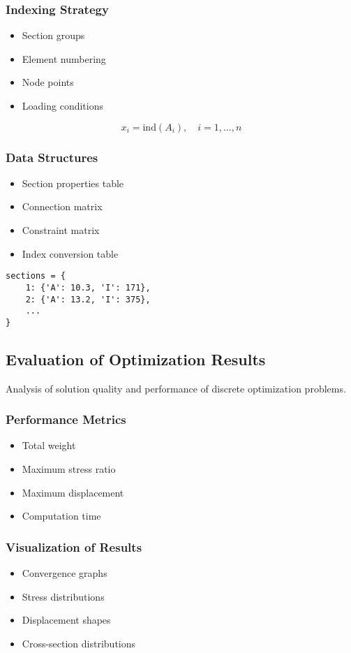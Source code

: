 \subsubsection{Indexing Strategy}
\begin{itemize}
    \item Section groups
    \item Element numbering
    \item Node points
    \item Loading conditions
\end{itemize}

\begin{equation}
x_i = \text{ind}(A_i), \quad i = 1,\ldots,n
\end{equation}


\subsubsection{Data Structures}
\begin{itemize}
    \item Section properties table
    \item Connection matrix
    \item Constraint matrix
    \item Index conversion table
\end{itemize}

\begin{tcolorbox}[title=Data Structure Example]
\begin{verbatim}
sections = {
    1: {'A': 10.3, 'I': 171},
    2: {'A': 13.2, 'I': 375},
    ...
}
\end{verbatim}
\end{tcolorbox}

\subsection{Evaluation of Optimization Results}
Analysis of solution quality and performance of discrete optimization problems.

\subsubsection{Performance Metrics}
\begin{itemize}
    \item Total weight
    \item Maximum stress ratio
    \item Maximum displacement
    \item Computation time
\end{itemize}

\subsubsection{Visualization of Results}
\begin{itemize}
    \item Convergence graphs
    \item Stress distributions
    \item Displacement shapes
    \item Cross-section distributions
\end{itemize} 
